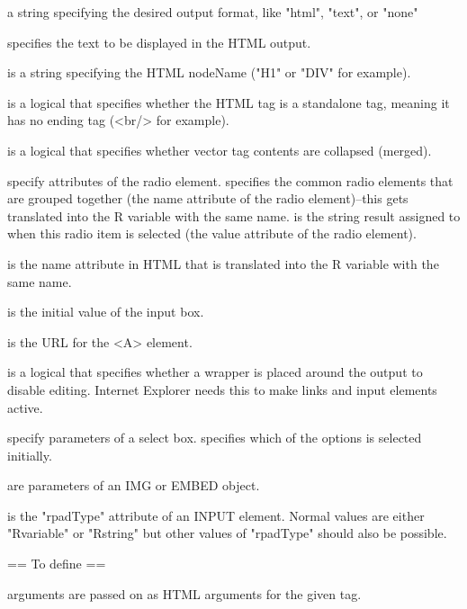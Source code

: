 \begin{Arguments}
\begin{ldescription}
\item[\code{Format}] a string specifying the desired output format, like "html", "text", or "none" 
\item[\code{text}] specifies the text to be displayed in the HTML output. 
\item[\code{tagName}] is a string specifying the HTML nodeName ("H1" or
"DIV" for example). 
\item[\code{standaloneTag}] is a logical that specifies whether the HTML tag
is a standalone tag, meaning it has no ending tag (<br/> for example). 
\item[\code{collapseContents}] is a logical that specifies whether vector
tag contents are collapsed (merged).
\item[\code{variableName, commonName}] specify attributes of the radio
element.  specifies the common radio elements that
are grouped together (the name attribute of the radio element)--this gets translated into the R variable with
the same name.  is the string result assigned to
 when this radio item is selected (the value attribute of the radio element).
\item[\code{name}] is the name attribute in HTML that is translated into the
R variable with the same name.
\item[\code{value}] is the initial value of the input box. 
\item[\code{url}] is the URL for the <A> element.
\item[\code{contenteditablewrapper}] is a logical that specifies whether a
wrapper is placed around the output to disable editing. Internet
Explorer needs this to make links and input elements active.
\item[\code{default, size, id, optionvalue}] specify parameters of a select
box.  specifies which of the options is selected initially.
\item[\code{filename, width, height}] are parameters of an IMG or EMBED object.
\item[\code{rpadType}] is the "rpadType" attribute of an INPUT
element. Normal values are either "Rvariable" or "Rstring" but other
values of "rpadType" should also be possible. 
\item[\code{x}] == To define == 
\item[\code{...}] arguments are passed on as HTML arguments for the given tag.
\end{ldescription}
\end{Arguments}
